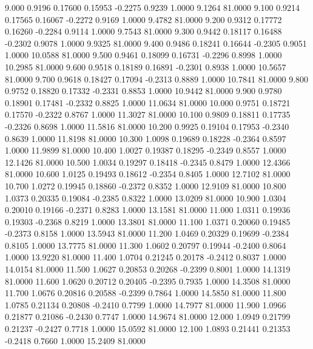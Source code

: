    9.000   0.9196   0.17600   0.15953  -0.2275   0.9239   1.0000   9.1264  81.0000
   9.100   0.9214   0.17565   0.16067  -0.2272   0.9169   1.0000   9.4782  81.0000
   9.200   0.9312   0.17772   0.16260  -0.2284   0.9114   1.0000   9.7543  81.0000
   9.300   0.9442   0.18117   0.16488  -0.2302   0.9078   1.0000   9.9325  81.0000
   9.400   0.9486   0.18241   0.16644  -0.2305   0.9051   1.0000  10.0588  81.0000
   9.500   0.9461   0.18099   0.16731  -0.2296   0.8998   1.0000  10.2985  81.0000
   9.600   0.9518   0.18189   0.16891  -0.2301   0.8938   1.0000  10.5657  81.0000
   9.700   0.9618   0.18427   0.17094  -0.2313   0.8889   1.0000  10.7841  81.0000
   9.800   0.9752   0.18820   0.17332  -0.2331   0.8853   1.0000  10.9442  81.0000
   9.900   0.9780   0.18901   0.17481  -0.2332   0.8825   1.0000  11.0634  81.0000
  10.000   0.9751   0.18721   0.17570  -0.2322   0.8767   1.0000  11.3027  81.0000
  10.100   0.9809   0.18811   0.17735  -0.2326   0.8698   1.0000  11.5816  81.0000
  10.200   0.9925   0.19104   0.17953  -0.2340   0.8639   1.0000  11.8198  81.0000
  10.300   1.0098   0.19689   0.18228  -0.2364   0.8597   1.0000  11.9899  81.0000
  10.400   1.0027   0.19387   0.18295  -0.2349   0.8557   1.0000  12.1426  81.0000
  10.500   1.0034   0.19297   0.18418  -0.2345   0.8479   1.0000  12.4366  81.0000
  10.600   1.0125   0.19493   0.18612  -0.2354   0.8405   1.0000  12.7102  81.0000
  10.700   1.0272   0.19945   0.18860  -0.2372   0.8352   1.0000  12.9109  81.0000
  10.800   1.0373   0.20335   0.19084  -0.2385   0.8322   1.0000  13.0209  81.0000
  10.900   1.0304   0.20010   0.19166  -0.2371   0.8283   1.0000  13.1581  81.0000
  11.000   1.0311   0.19936   0.19303  -0.2368   0.8219   1.0000  13.3801  81.0000
  11.100   1.0371   0.20060   0.19485  -0.2373   0.8158   1.0000  13.5943  81.0000
  11.200   1.0469   0.20329   0.19699  -0.2384   0.8105   1.0000  13.7775  81.0000
  11.300   1.0602   0.20797   0.19944  -0.2400   0.8064   1.0000  13.9220  81.0000
  11.400   1.0704   0.21245   0.20178  -0.2412   0.8037   1.0000  14.0154  81.0000
  11.500   1.0627   0.20853   0.20268  -0.2399   0.8001   1.0000  14.1319  81.0000
  11.600   1.0620   0.20712   0.20405  -0.2395   0.7935   1.0000  14.3508  81.0000
  11.700   1.0676   0.20816   0.20588  -0.2399   0.7864   1.0000  14.5850  81.0000
  11.800   1.0785   0.21134   0.20808  -0.2410   0.7799   1.0000  14.7977  81.0000
  11.900   1.0966   0.21877   0.21086  -0.2430   0.7747   1.0000  14.9674  81.0000
  12.000   1.0949   0.21799   0.21237  -0.2427   0.7718   1.0000  15.0592  81.0000
  12.100   1.0893   0.21441   0.21353  -0.2418   0.7660   1.0000  15.2409  81.0000
